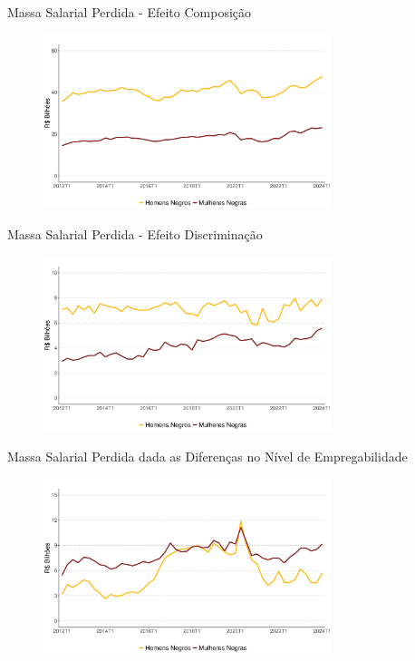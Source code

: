 \documentclass[10pt, xcolor=x11names,compress]{beamer}
\begin{document}
	\begin{frame}{Massa Salarial Perdida - Efeito Composição}
	\begin{figure}
		\centering
		\includegraphics[width = 0.75\textwidth]{figures_output/perda_massa_salarial_composicao.pdf}
	\end{figure}
\end{frame}	

	\begin{frame}{Massa Salarial Perdida - Efeito Discriminação}
	\begin{figure}
		\centering
		\includegraphics[width = 0.75\textwidth]{figures_output/perda_massa_salario_discriminacao.pdf}
	\end{figure}
	\end{frame}	
	
		\begin{frame}{Massa Salarial Perdida dada as Diferenças no Nível de Empregabilidade }
		\begin{figure}
			\centering
			\includegraphics[width = 0.75\textwidth]{figures_output/perda_massa_emp_total.pdf}
		\end{figure}
	\end{frame}	
	
\end{document}
